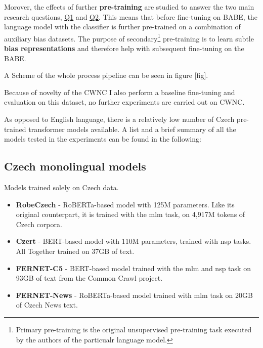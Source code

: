 Morover, the effects of further \textbf{pre-training} are studied to answer the two main research questions, \hyperref[Q1]{Q1} and \hyperref[Q2]{Q2}. This means that before fine-tuning on BABE, the language model with the classifier is further pre-trained on a combination of auxiliary bias datasets. The purpose of secondary\footnote{Primary pre-training is the original unsupervised pre-training task executed by the authors of the particualr language model.} pre-training is to learn subtle \textbf{bias representations} and therefore help with subsequent fine-tuning on the BABE.

A Scheme of the whole process pipeline can be seen in figure [fig].

Because of novelty of the CWNC I also perform a baseline fine-tuning and evaluation on this dataset, no further experiments are carried out on CWNC.

As opposed to English language, there is a relatively low number of Czech pre-trained transformer models available. A list and a brief summary of all the models tested in the experiments can be found in the following:




\subsection{Czech monolingual models}
Models trained solely on Czech data.
\begin{itemize}
    \item \textbf{RobeCzech} \cite{strakarobeczech} - RoBERTa-based model with 125M parameters. Like its original counterpart, it is trained with the \gls{mlm} task, on 4,917M tokens of Czech corpora.
    \item \textbf{Czert} \cite{sido-etal-2021-czert} - BERT-based model with 110M parameters, trained with \gls{nsp} tasks. All Together trained on 37GB of text. 
    \item \textbf{FERNET-C5} \cite{lehevcka2021comparison} - BERT-based model trained with the \gls{mlm} and \gls{nsp} task on 93GB of text from the Common Crawl project.
    \item \textbf{FERNET-News} \cite{lehevcka2021comparison} - RoBERTa-based model trained with \gls{mlm} task on 20GB of Czech News text.
\end{itemize}




